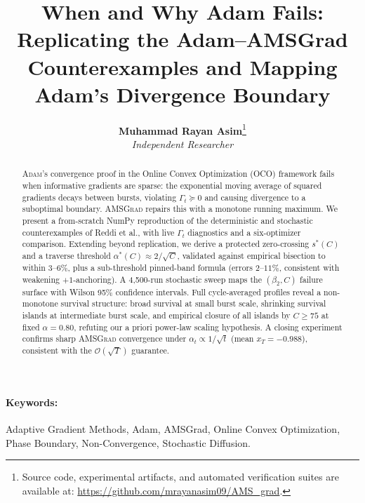 \documentclass[10pt,twocolumn]{article}
\title{\textbf{When and Why Adam Fails: Replicating the Adam--AMSGrad Counterexamples and Mapping Adam's Divergence Boundary}}
\author{
    \textbf{Muhammad Rayan Asim}\thanks{Source code, experimental artifacts, and automated verification suites are available at: \url{https://github.com/mrayanasim09/AMS_grad}.} \\
    \textit{Independent Researcher}
}
\date{}
\begin{document}
\maketitle

\begin{abstract}
\textsc{Adam}'s convergence proof in the Online Convex Optimization (OCO) framework fails when informative gradients are sparse: the exponential moving average of squared gradients decays between bursts, violating $\Gamma_t \succeq 0$ and causing divergence to a suboptimal boundary. \textsc{AMSGrad} repairs this with a monotone running maximum. We present a from-scratch NumPy reproduction of the deterministic and stochastic counterexamples of Reddi et al., with live $\Gamma_t$ diagnostics and a six-optimizer comparison. Extending beyond replication, we derive a protected zero-crossing $s^*(C)$ and a traverse threshold $\alpha^*(C) \approx 2/\sqrt{C}$, validated against empirical bisection to within $3\text{--}6\%$, plus a sub-threshold pinned-band formula (errors $2\text{--}11\%$, consistent with weakening $+1$-anchoring). A 4,500-run stochastic sweep maps the $(\beta_2, C)$ failure surface with Wilson 95\% confidence intervals. Full cycle-averaged profiles reveal a non-monotone survival structure: broad survival at small burst scale, shrinking survival islands at intermediate burst scale, and empirical closure of all islands by $C \ge 75$ at fixed $\alpha = 0.80$, refuting our a priori power-law scaling hypothesis. A closing experiment confirms sharp \textsc{AMSGrad} convergence under $\alpha_t \propto 1/\sqrt{t}$ (mean $x_T = -0.988$), consistent with the $\mathcal{O}(\sqrt{T})$ guarantee.
\end{abstract}

\paragraph{Keywords:} Adaptive Gradient Methods, Adam, AMSGrad, Online Convex Optimization, Phase Boundary, Non-Convergence, Stochastic Diffusion.












\end{document}
